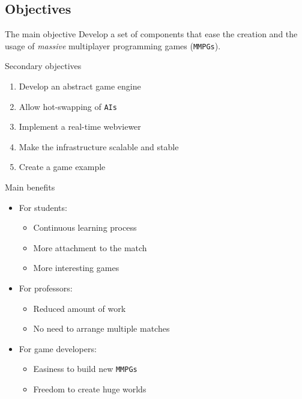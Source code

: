 \documentclass{beamer}
\begin{document}
\subsection{Objectives}
\begin{frame}{The main objective}
Develop a set of components that ease the creation and the usage of \emph{massive} multiplayer programming games (\texttt{MMPGs}).
\end{frame}
\begin{frame}{Secondary objectives}
\begin{enumerate}
\item
Develop an abstract game engine
\item
Allow hot-swapping of \texttt{AIs}
\item
Implement a real-time webviewer
\item
Make the infrastructure scalable and stable
\item
Create a game example
\end{enumerate}
\end{frame}
\begin{frame}{Main benefits}
\begin{itemize}
\item
For students:
\begin{itemize}
\item
Continuous learning process
\item
More attachment to the match
\item
More interesting games
\end{itemize}
\item
For professors:
\begin{itemize}
\item
Reduced amount of work
\item
No need to arrange multiple matches
\end{itemize}
\item
For game developers:
\begin{itemize}
\item
Easiness to build new \texttt{MMPGs}
\item
Freedom to create huge worlds
\end{itemize}
\end{itemize}
\end{frame}
\end{document}
